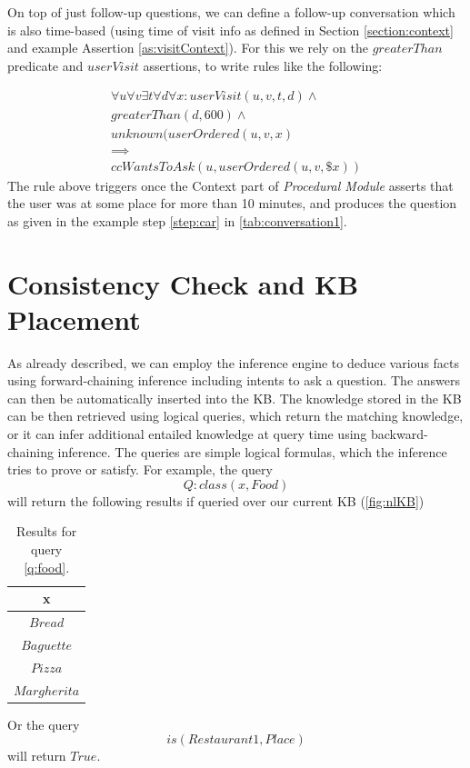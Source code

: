 On top of just follow-up questions, we can define a follow-up conversation which
is also time-based (using time of visit info as defined in 
Section \ref{section:context} and example Assertion \ref{as:visitContext}). For
this we rely on the $greaterThan$ predicate and $userVisit$ assertions, to
write rules like the following:

\begin{equation}\label{rule:whatOrdered}
\begin{gathered}
\forall u\forall v \exists t\forall d\forall x: userVisit(u,v,t,d) \land\\
    greaterThan(d,600)\land \\
    unknown(userOrdered(u,v,x) \\
    \implies \\
    ccWantsToAsk(u, userOrdered(u,v,\$x))
\end{gathered}
\end{equation}
The rule above triggers once the Context part of \emph{Procedural Module}
asserts that the user was at some place for more than 10 minutes, and
produces the question as given in the example step \ref{step:car} in 
\autoref{tab:conversation1}.

\section{Consistency Check and KB Placement}
\label{section:consistency}
As already described, we can employ the inference engine to deduce various 
facts using forward-chaining inference including intents to ask a question. 
The answers can then be automatically inserted into the KB. The knowledge 
stored in the KB can be then retrieved using logical queries, which return 
the matching knowledge, or it can infer additional entailed knowledge at 
query time using backward-chaining inference. The queries are simple logical 
formulas, which the inference tries to prove or satisfy. For example, the
query
\begin{equation}\label{q:food}
	Q:class(x,Food)
\end{equation}
will return the following results if queried over our current KB 
(\autoref{fig:nlKB})

\begin{table}[H]
\centering
\caption{Results for query \ref{q:food}.}
\label{tab:nlResultsFood}
\begin{tabular}{|c|}
	\hline
	\textbf{x} \\
    \hline
    $Bread$ \\
    \hline
    $Baguette$ \\
    \hline 
	$Pizza$ \\
	\hline
	$Margherita$ \\
	\hline
\end{tabular}
\end{table}
Or the query
\begin{equation}
is(Restaurant1,Place)
\end{equation}
will return $True$.

